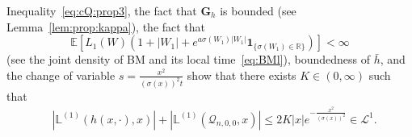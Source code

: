 \documentclass[12pt]{article}
\numberwithin{equation}{section}
\theoremstyle{definition}
\theoremstyle{remark}
\newcommand{\RR}{\mathbb{R}}
\newcommand{\EE}{\mathbb{E}}
\newcommand{\cQ}{\mathcal{Q}}
\newcommand{\ind}[1]{\mathbf{1}_{#1}}
\newcommand{\vd}{\,\mathrm{d}}
\newcommand{\Lone}{\mathcal{L}^1}
\newcommand{\bfG}[1]{\mathbf{G}_{#1}}
\newcommand{\Lm}[3]{\mathbb{L}^{(#2)}(#1,#3)}
\begin{document}
Inequality~\eqref{eq:cQ:prop3}, 
the fact that $\bfG{h}$ is bounded (see Lemma~\ref{lem:prop:kappa}), 
the fact that
\begin{equation}
	\EE\!\left[ L_1(W)  (1 + |W_1|+ e^{a \sigma(W_1) |W_1|}  \ind{\{\sigma(W_1)\in \RR\}}) \right]<\infty
\end{equation}
(see the joint density of BM and its local time~\eqref{eq:BMl}),
boundedness of $\bar h$, and the change of variable $s= \frac{x^2}{ (\sigma(x))^2 t}$ show that there exists $K\in (0,\infty)$ such that 
\begin{equation}
\begin{split}
	& |\Lm{h(x,\cdot)}{1}{x}| + |\Lm{\cQ_{n,0,0}}{1}{x}| 
	\leq 
	2 K |x| e^{-\frac{x^2}{(\sigma(x))^2}} \in \Lone.
\end{split}
\end{equation}
\end{document}

